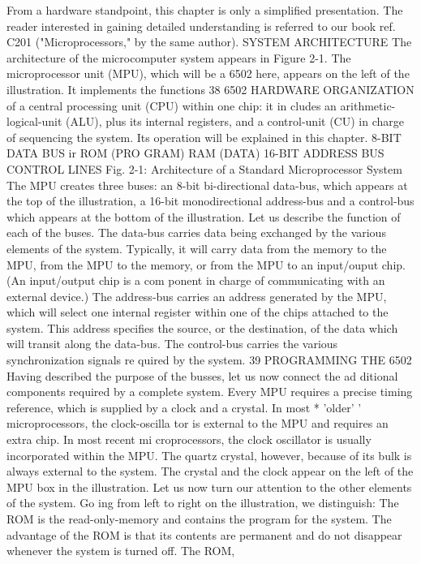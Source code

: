 From a hardware standpoint, this chapter is only a simplified
presentation. The reader interested in gaining detailed understanding
is referred to our book ref. C201 ("Microprocessors," by the same
author).
SYSTEM ARCHITECTURE
The architecture of the microcomputer system appears in Figure
2-1. The microprocessor unit (MPU), which will be a 6502 here,
appears on the left of the illustration. It implements the functions
38
6502 HARDWARE ORGANIZATION
of a central processing unit (CPU) within one chip: it in
cludes an arithmetic-logical-unit (ALU), plus its internal registers,
and a control-unit (CU) in charge of sequencing the system.
Its operation will be explained in this chapter.
8-BIT DATA BUS
ir
ROM
(PRO
GRAM)
RAM
(DATA)
16-BIT ADDRESS BUS
CONTROL LINES
Fig. 2-1: Architecture of a Standard Microprocessor System
The MPU creates three buses: an 8-bit bi-directional data-bus,
which appears at the top of the illustration, a 16-bit monodirectional
address-bus and a control-bus which appears at the
bottom of the illustration. Let us describe the function of each of
the buses.
The data-bus carries data being exchanged by the various
elements of the system. Typically, it will carry data from the
memory to the MPU, from the MPU to the memory, or from
the MPU to an input/ouput chip. (An input/output chip is a com
ponent in charge of communicating with an external device.)
The address-bus carries an address generated by the MPU,
which will select one internal register within one of the chips
attached to the system. This address specifies the source, or the
destination, of the data which will transit along the data-bus.
The control-bus carries the various synchronization signals re
quired by the system.
39
PROGRAMMING THE 6502
Having described the purpose of the busses, let us now connect the ad
ditional components required by a complete system.
Every MPU requires a precise timing reference, which is supplied by a
clock and a crystal. In most * 'older' ' microprocessors, the clock-oscilla
tor is external to the MPU and requires an extra chip. In most recent mi
croprocessors, the clock oscillator is usually incorporated within the
MPU. The quartz crystal, however, because of its bulk is always external
to the system. The crystal and the clock appear on the left of the MPU
box in the illustration.
Let us now turn our attention to the other elements of the system. Go
ing from left to right on the illustration, we distinguish:
The ROM is the read-only-memory and contains the program for the
system. The advantage of the ROM is that its contents are permanent
and do not disappear whenever the system is turned off. The ROM,
